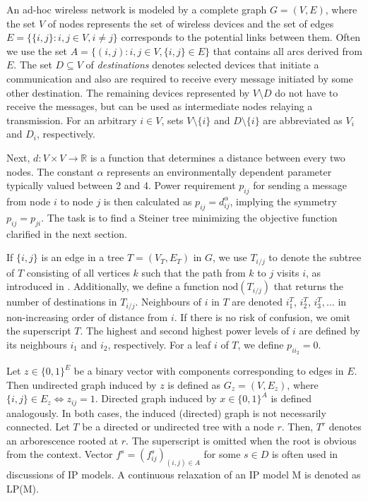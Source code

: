 An ad-hoc wireless network is modeled by a complete graph $G=(V,E)$, where the set $V$ of nodes represents the set of wireless devices and the set of edges $E=\{\{i,j\}:i,j\in V, i\neq j\}$ corresponds to the potential links between them.
Often we use the set $A=\{(i,j):i,j\in V,\{i,j\}\in E\}$ that contains all arcs derived from $E$.
The set $D\subseteq V$ of \emph{destinations} denotes selected devices that initiate a communication and also are required to receive every message initiated by some other destination.
The remaining devices represented by $V\setminus D$ do not have to receive the messages, but can be used as intermediate nodes relaying a transmission.
For an arbitrary $i\in V$, sets $V\setminus \{i\}$ and $D\setminus\{i\}$ are abbreviated as $V_i$ and $D_i$, respectively.
 
Next, $d: V\times V\rightarrow \mathbb{R}$ is a function that determines a distance between every two nodes.
The constant $\alpha$ represents an environmentally dependent parameter typically valued between 2 and 4.
Power requirement $p_{ij}$ for sending a message from node $i$ to node $j$ is then calculated as $p_{ij}=d^{\alpha}_{ij}$, implying the symmetry $p_{ij}=p_{ji}$.
The task is to find a Steiner tree minimizing the objective function clarified in the next section.

If $\{i,j\}$ is an edge in a tree $T=(V_T,E_T)$ in $G$, we use $T_{i/j}$ to denote the subtree of $T$ consisting of all vertices $k$ such that the path from $k$ to $j$ visits $i$, as introduced in \cite{Haugland12Dual}.
Additionally, we define a function $\text{nod}(T_{i/j})$ that returns the number of destinations in $T_{i/j}$.
Neighbours of $i$ in $T$ are denoted $i^T_1$, $i^T_2$, $i^T_3, \dots$ in non-increasing order of distance from $i$.
If there is no risk of confusion, we omit the superscript $T$.
The highest and second highest power levels of $i$ are defined by its neighbours $i_1$ and $i_2$, respectively.
For a leaf $i$ of $T$, we define $p_{ii_2}=0$.

Let $z \in \{0,1\}^E$ be a binary vector with components corresponding to edges in $E$.
Then undirected graph induced by $z$ is defined as  $G_z=(V,E_z)$, where $\{i,j\}\in E_z\Leftrightarrow z_{ij}=1$.
Directed graph induced by $x \in \{0,1\}^A$ is defined analogously.
In both cases, the induced (directed) graph is not necessarily connected.
Let $T$ be a directed or undirected tree with a node $r$.
Then, $T^r$ denotes an arborescence rooted at $r$. 
The superscript is omitted when the root is obvious from the context.
Vector $f^s=(f^s_{ij})_{(i,j)\in A}$ for some $s\in D$ is often used in discussions of IP models.
A continuous relaxation of an IP model M is denoted as LP(M).

